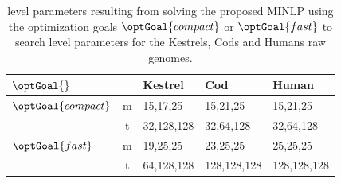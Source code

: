 \begin{table}
    \centering
    \begin{tabular}{lc|lll}
        \toprule
        $\optGoal{}$ & & Kestrel & Cod & Human \\
        \midrule
        $\optGoal{compact}$ & m & 15,17,25 & 15,21,25 & 15,21,25 \\
         & t & 32,128,128 & 32,64,128 & 32,64,128 \\
        \midrule
        $\optGoal{fast}$ & m & 19,25,25 & 23,25,25 & 25,25,25 \\
         & t & 64,128,128 & 128,128,128 & 128,128,128 \\
        \bottomrule
    \end{tabular}
    \caption{level parameters resulting from solving the proposed MINLP using the optimization goals $\optGoal{compact}$ or $\optGoal{fast}$ to search level parameters for the Kestrels, Cods and Humans raw genomes.}
    \label{tab:MINLPOptimalParameters}
\end{table}